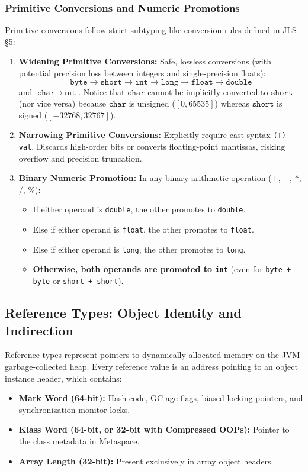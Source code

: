 \documentclass[10pt,journal,compsoc,onecolumn]{IEEEtran}
\begin{document}
\subsubsection{Primitive Conversions and Numeric Promotions}
Primitive conversions follow strict subtyping-like conversion rules defined in JLS \S5:
\begin{enumerate}
    \item \textbf{Widening Primitive Conversions:} Safe, lossless conversions (with potential precision loss between integers and single-precision floats):
    \begin{equation}
    \texttt{byte} \to \texttt{short} \to \texttt{int} \to \texttt{long} \to \texttt{float} \to \texttt{double}
    \end{equation}
    and $\texttt{char} \to \texttt{int}$. Notice that $\texttt{char}$ cannot be implicitly converted to $\texttt{short}$ (nor vice versa) because $\texttt{char}$ is unsigned ($[0, 65535]$) whereas $\texttt{short}$ is signed ($[-32768, 32767]$).
    \item \textbf{Narrowing Primitive Conversions:} Explicitly require cast syntax \texttt{(T) val}. Discards high-order bits or converts floating-point mantissas, risking overflow and precision truncation.
    \item \textbf{Binary Numeric Promotion:} In any binary arithmetic operation ($+$, $-$, $*$, $/$, $\%$):
    \begin{itemize}
        \item If either operand is \texttt{double}, the other promotes to \texttt{double}.
        \item Else if either operand is \texttt{float}, the other promotes to \texttt{float}.
        \item Else if either operand is \texttt{long}, the other promotes to \texttt{long}.
        \item \textbf{Otherwise, both operands are promoted to \texttt{int}} (even for \texttt{byte + byte} or \texttt{short + short}).
    \end{itemize}
\end{enumerate}

\subsection{Reference Types: Object Identity and Indirection}
Reference types represent pointers to dynamically allocated memory on the JVM garbage-collected heap. Every reference value is an address pointing to an object instance header, which contains:
\begin{itemize}
    \item \textbf{Mark Word (64-bit):} Hash code, GC age flags, biased locking pointers, and synchronization monitor locks.
    \item \textbf{Klass Word (64-bit, or 32-bit with Compressed OOPs):} Pointer to the class metadata in Metaspace.
    \item \textbf{Array Length (32-bit):} Present exclusively in array object headers.
\end{itemize}
\end{document}
